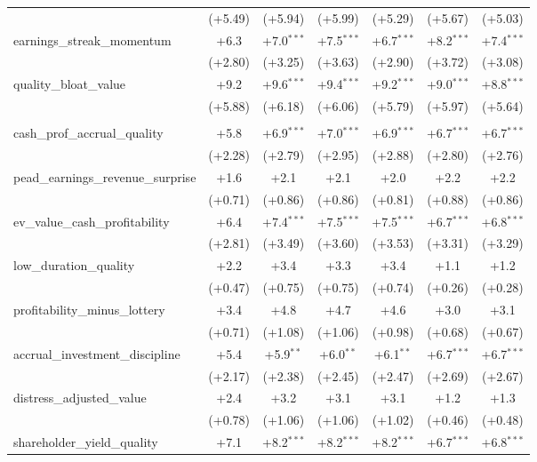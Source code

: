 \begin{table}[htbp]
\begin{threeparttable}
\begin{tabular}{lcccccc}
 & (+5.49) & (+5.94) & (+5.99) & (+5.29) & (+5.67) & (+5.03) \\
\addlinespace
earnings\_streak\_momentum & +6.3 & +7.0$^{***}$ & +7.5$^{***}$ & +6.7$^{***}$ & +8.2$^{***}$ & +7.4$^{***}$ \\
 & (+2.80) & (+3.25) & (+3.63) & (+2.90) & (+3.72) & (+3.08) \\
\addlinespace
quality\_bloat\_value & +9.2 & +9.6$^{***}$ & +9.4$^{***}$ & +9.2$^{***}$ & +9.0$^{***}$ & +8.8$^{***}$ \\
 & (+5.88) & (+6.18) & (+6.06) & (+5.79) & (+5.97) & (+5.64) \\
\addlinespace
\midrule
\multicolumn{7}{l}{\textit{Panel B: Out-of-sample (post-2000-12-31)}} \\
\addlinespace
cash\_prof\_accrual\_quality & +5.8 & +6.9$^{***}$ & +7.0$^{***}$ & +6.9$^{***}$ & +6.7$^{***}$ & +6.7$^{***}$ \\
 & (+2.28) & (+2.79) & (+2.95) & (+2.88) & (+2.80) & (+2.76) \\
\addlinespace
pead\_earnings\_revenue\_surprise & +1.6 & +2.1 & +2.1 & +2.0 & +2.2 & +2.2 \\
 & (+0.71) & (+0.86) & (+0.86) & (+0.81) & (+0.88) & (+0.86) \\
\addlinespace
ev\_value\_cash\_profitability & +6.4 & +7.4$^{***}$ & +7.5$^{***}$ & +7.5$^{***}$ & +6.7$^{***}$ & +6.8$^{***}$ \\
 & (+2.81) & (+3.49) & (+3.60) & (+3.53) & (+3.31) & (+3.29) \\
\addlinespace
low\_duration\_quality & +2.2 & +3.4 & +3.3 & +3.4 & +1.1 & +1.2 \\
 & (+0.47) & (+0.75) & (+0.75) & (+0.74) & (+0.26) & (+0.28) \\
\addlinespace
profitability\_minus\_lottery & +3.4 & +4.8 & +4.7 & +4.6 & +3.0 & +3.1 \\
 & (+0.71) & (+1.08) & (+1.06) & (+0.98) & (+0.68) & (+0.67) \\
\addlinespace
accrual\_investment\_discipline & +5.4 & +5.9$^{**}$ & +6.0$^{**}$ & +6.1$^{**}$ & +6.7$^{***}$ & +6.7$^{***}$ \\
 & (+2.17) & (+2.38) & (+2.45) & (+2.47) & (+2.69) & (+2.67) \\
\addlinespace
distress\_adjusted\_value & +2.4 & +3.2 & +3.1 & +3.1 & +1.2 & +1.3 \\
 & (+0.78) & (+1.06) & (+1.06) & (+1.02) & (+0.46) & (+0.48) \\
\addlinespace
shareholder\_yield\_quality & +7.1 & +8.2$^{***}$ & +8.2$^{***}$ & +8.2$^{***}$ & +6.7$^{***}$ & +6.8$^{***}$ \\

\end{tabular}
\end{threeparttable}
\end{table}
